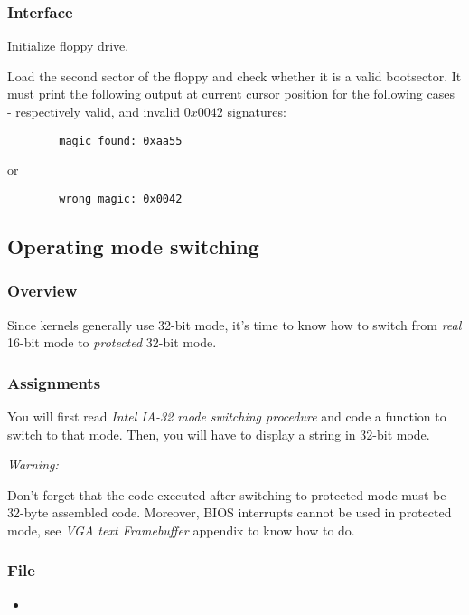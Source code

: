 \subsubsection*{Interface}
{
  Initialize floppy drive.
}

{
  Load the second sector of the floppy and check whether it is a valid
  bootsector. It must print the following output at current cursor
  position for the following cases - respectively valid, and invalid $0x0042$
  signatures:
}
\begin{verbatim}
        magic found: 0xaa55
\end{verbatim}
\command{}
{
  or
}
\begin{verbatim}
        wrong magic: 0x0042
\end{verbatim}

%
%

\newpage

\subsection{Operating mode switching}

\subsubsection*{Overview}
Since kernels generally use 32-bit mode, it's time to know how to switch from
\emph{real} 16-bit mode to \emph{protected} 32-bit mode.

\subsubsection*{Assignments}
You will first read \emph{Intel IA-32 mode switching procedure} and code a
function to switch to that mode. Then, you will have to display a string in
32-bit mode.

{\em Warning:}

Don't forget that the code executed after switching to protected mode must be
32-byte assembled code. Moreover, BIOS interrupts cannot be used in protected
mode, see \emph{VGA text Framebuffer} appendix to know how to do.

\subsubsection*{File}
\begin{itemize}
  \item {}
\end{itemize}

